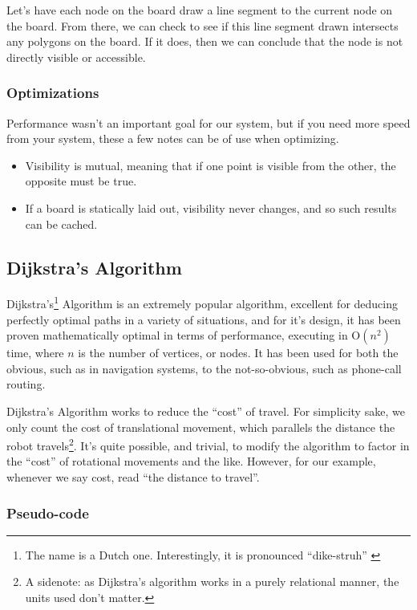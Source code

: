 \documentclass[letterpaper, 12pt]{article}
\begin{document}
\begin{multicols}{2}
Let's have each node on the board draw a line segment to the current node on the
board. From there, we can check to see if this line segment drawn intersects any
polygons on the board. If it does, then we can conclude that the node is not
directly visible or accessible.

\subsubsection{Optimizations}

Performance wasn't an important goal for our system, but if you need more speed
from your system, these a few notes can be of use when optimizing.

\begin{itemize}
    \item Visibility is mutual, meaning that if one point is visible from the
          other, the opposite must be true. \cite{wikiraytrace}
    \item If a board is statically laid out, visibility never changes, and so
          such results can be cached.
\end{itemize}

\subsection{Dijkstra's Algorithm}

Dijkstra's\footnote{The name is a Dutch one. Interestingly, it is pronounced
``dike-struh'' \cite{dikestruh}} Algorithm is an extremely popular algorithm,
excellent for deducing perfectly optimal paths in a variety of situations, and
for it's design, it has been proven mathematically optimal in terms of
performance, executing in \(\mathrm{O}\!\left(n^2\right)\) time, where \(n\) is
the number of vertices, or nodes. It has been used for both the obvious, such as
in navigation systems, to the not-so-obvious, such as phone-call routing.

Dijkstra's Algorithm works to reduce the ``cost'' of travel. For simplicity
sake, we only count the cost of translational movement, which parallels the
distance the robot travels\footnote{A sidenote: as Dijkstra's algorithm works in
a purely relational manner, the units used don't matter.}. It's quite possible,
and trivial, to modify the algorithm to factor in the ``cost'' of rotational
movements and the like. However, for our example, whenever we say cost, read
``the distance to travel''.

\subsubsection{Pseudo-code \cite{wikidijkstra}}


\end{multicols}
\end{document}
